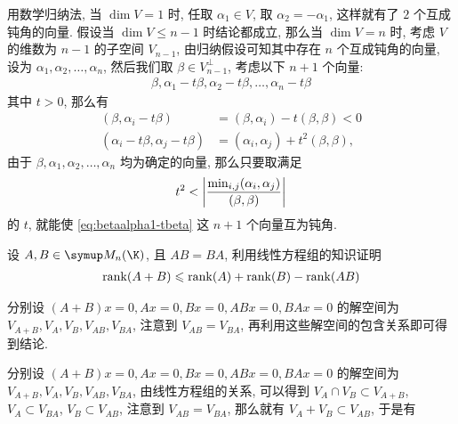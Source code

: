 \begin{exercise}[series=exer]
\begin{answer}
\begin{answersheet}
          \item 用数学归纳法, 当 $ \dim V = 1 $ 时, 任取 $ \alpha_{1} \in V $, 取 $ \alpha_{2} = -\alpha_{1} $, 这样就有了 $ 2 $ 个互成钝角的向量. 假设当 $ \dim V \le n - 1 $ 时结论都成立, 那么当 $ \dim V = n $ 时, 考虑 $ V $ 的维数为 $ n - 1 $ 的子空间 $ V_{n - 1} $, 由归纳假设可知其中存在 $ n $ 个互成钝角的向量, 设为 $ \alpha_{1}, \alpha_{2}, \dots, \alpha_{n} $, 然后我们取 $ \beta \in V_{n - 1}^{\bot} $, 考虑以下 $ n + 1 $ 个向量:
          \begin{align}\label{eq:betaalpha1-tbeta}
              \beta, \alpha_{1} - t\beta, \alpha_{2} - t\beta, \dots, \alpha_{n} - t\beta
          \end{align}
          其中 $ t > 0 $, 那么有
          \begin{align*}
              (\beta, \alpha_{i} - t\beta) & = (\beta, \alpha_{i}) - t(\beta, \beta) < 0\\
              (\alpha_{i} - t\beta, \alpha_{j} - t\beta) & = (\alpha_{i}, \alpha_{j}) + t^{2}(\beta, \beta),
          \end{align*}
          由于 $ \beta, \alpha_{1}, \alpha_{2}, \dots, \alpha_{n} $ 均为确定的向量, 那么只要取满足
          \begin{align*}
              t^{2} < \abs{\frac{\min_{i, j}(\alpha_{i}, \alpha_{j})}{(\beta, \beta)}}
          \end{align*}
          的 $ t $, 就能使 \eqref{eq:betaalpha1-tbeta} 这 $ n + 1 $ 个向量互为钝角.
      \end{answersheet}
  \end{answer}
  \item 设 $ A, B \in \MM[\K] $, 且 $ AB = BA $, 利用线性方程组的知识证明
  \begin{align*}
      \rank(A + B) \leqslant \rank(A) + \rank(B) - \rank(AB)
  \end{align*}
  \begin{hint}
      分别设 $ (A + B)x = 0, Ax = 0, Bx = 0, ABx = 0, BAx = 0 $ 的解空间为 $ V_{A+B}, V_{A}, V_{B}, V_{AB}, V_{BA} $, 注意到 $ V_{AB} = V_{BA} $, 再利用这些解空间的包含关系即可得到结论.
  \end{hint}
  \begin{answer}
      分别设 $ (A + B)x = 0, Ax = 0, Bx = 0, ABx = 0, BAx = 0 $ 的解空间为 $ V_{A+B}, V_{A}, V_{B}, V_{AB}, V_{BA} $, 由线性方程组的关系, 可以得到 $ V_{A} \cap V_{B} \subset V_{A + B} $, $ V_{A} \subset V_{BA}  $, $ V_{B} \subset V_{AB} $, 注意到 $ V_{AB} = V_{BA} $, 那么就有 $ V_{A} + V_{B} \subset V_{AB} $, 于是有
      \begin{align*}

\end{align*}
\end{answer}
\end{exercise}
